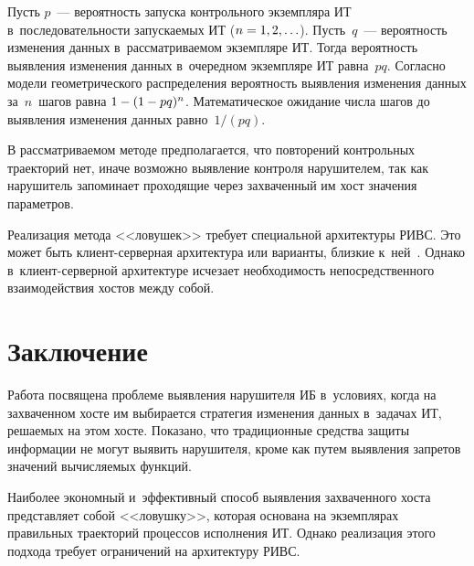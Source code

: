 \begin{multicols}{2}
  Пусть $p$~--- вероятность запуска контрольного экземпляра ИТ 
в~последовательности запускаемых ИТ ($n\hm= 1, 2, \ldots$). Пусть~$q$~--- 
вероятность изменения данных в~рассматриваемом экземпляре ИТ. Тогда 
вероятность выявления изменения данных в~очередном экземпляре ИТ 
равна~$pq$. Согласно модели геометрического распределения вероятность 
выявления изменения данных за~$n$~шагов равна $1\hm- (1\hm- pq)^n$. 
Математическое ожидание числа шагов до выявления изменения данных 
рав\-но~$1/(pq)$. 
{

}
  
  В рассматриваемом методе предполагается, что повторений контрольных 
траекторий нет, иначе возможно выявление контроля  нарушителем, так как 
нарушитель запоминает проходящие через захваченный им хост значения 
па\-ра\-метров. 
  
  Реализация метода <<ловушек>> требует специальной архитектуры РИВС. Это 
может быть кли\-ент-сер\-вер\-ная архитектура или варианты, близкие 
к~ней~\cite{3-gr, 9-gr}. Однако в~кли\-ент-сер\-вер\-ной архитектуре исчезает 
необходимость непосредственного взаимодействия хостов между собой. 
  
\section{Заключение}

  Работа посвящена проблеме выявления нарушителя ИБ в~условиях, когда на 
захваченном хосте им выбирается стратегия изменения данных в~задачах ИТ, 
решаемых на этом хосте. Показано, что традиционные средства защиты 
информации не могут выявить нарушителя, кроме как путем выявления запретов 
значений вычисляемых функций. 
  
  Наиболее экономный и~эффективный способ выявления захваченного хоста 
представляет собой <<ловушку>>, которая основана на экземплярах правильных 
траекторий процессов исполнения ИТ. Однако реализация этого подхода требует 
ограничений на архитектуру РИВС. 
  

\end{multicols}
